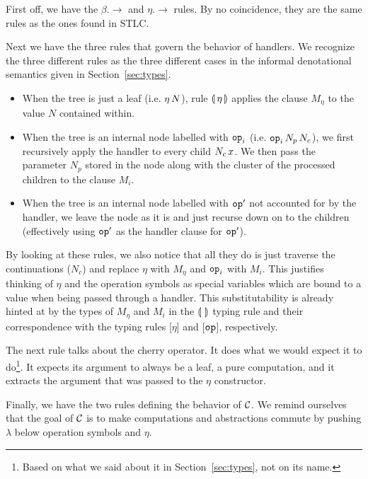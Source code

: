 First off, we have the $\beta.\to$ and $\eta.\to$ rules. By no
coincidence, they are the same rules as the ones found in STLC.

Next we have the three rules that govern the behavior of handlers. We
recognize the three different rules as the three different cases in the
informal denotational semantics given in Section~\ref{sec:types}.

\begin{itemize}
\item When the tree is just a leaf (i.e. $\eta\,N$), rule
  $\llparenthesis \, \eta \, \rrparenthesis$ applies the clause $M_\eta$ to the value $N$ contained
  within.
\item When the tree is an internal node labelled with $\mathtt{op}_i$
  (i.e. $\mathtt{op}_i\,N_p\,N_c$), we first recursively apply the
  handler to every child $N_c\,x$. We then pass the parameter $N_p$
  stored in the node along with the cluster of the processed children to
  the clause $M_i$.
\item When the tree is an internal node labelled with $\mathtt{op}'$ not
  accounted for by the handler, we leave the node as it is and just recurse
  down on to the children (effectively using $\mathtt{op}'$ as the handler
  clause for $\mathtt{op}'$).
\end{itemize}

By looking at these rules, we also notice that all they do is just traverse
the continuations ($N_c$) and replace $\eta$ with $M_\eta$ and $\mathtt{op}_i$
with $M_i$. This justifies thinking of $\eta$ and the operation symbols as
special variables which are bound to a value when being passed through a
handler. This substitutability is already hinted at by the types of
$M_\eta$ and $M_i$ in the $\llparenthesis \,  \, \rrparenthesis$ typing rule and their correspondence
with the typing rules [$\eta$] and [$\mathtt{op}$], respectively.

The next rule talks about the cherry operator. It does what we would expect
it to do\footnote{Based on what we said about it in
  Section~\ref{sec:types}, not on its name.}. It expects its argument to
always be a leaf, a pure computation, and it extracts the argument that was
passed to the $\eta$ constructor.

Finally, we have the two rules defining the behavior of $\mathcal{C}$. We remind
ourselves that the goal of $\mathcal{C}$ is to make computations and abstractions
commute by pushing $\lambda$ below operation symbols and $\eta$.

